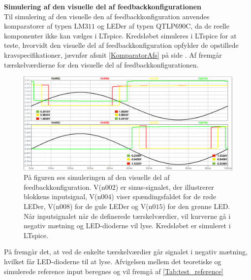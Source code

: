 \noindent\textbf{Simulering af den visuelle del af feedbackkonfigurationen} \\
Til simulering af den visuelle den af feedbackkonfiguration anvendes komparatorer af typen LM$311$ og LEDer af typen QTLP$690$C, da de reelle komponenter ikke kan vælges i LTspice. Kredsløbet simuleres i LTspice for at teste, hvorvidt den visuelle del af feedbackkonfiguration opfylder de opstillede kravspecifikationer, jævnfør afsnit \ref{KomparatorAfs} på side \pageref{KomparatorAfs}. Af  fremgår tærskelværdierne for den visuelle del af feedbackkonfigurationen. 

\begin{figure}[H]
	\centering
	\includegraphics[scale=0.3]{figures/cProblemloesning/komparator_visuel_simulering_samlet1.PNG}
	\caption{På figuren ses simuleringen af den visuelle del af feedbackkonfiguration. V(n$002$) er sinus-signalet, der illustrerer blokkens inputsignal, V(n$004$) viser spændingsfaldet for de røde LEDer, V(n$008$) for de gule LEDer og V(n$015$) for den grønne LED. Når inputsignalet når de definerede tærskelværdier, vil kurverne gå i negativ mætning og LED-dioderne vil lyse. Kredsløbet er simuleret i LTspice.}
	\label{fig:komparator_visuel_simulering_samlet1}
\end{figure}

\noindent På  fremgår det, at ved de enkelte tærskelværdier går signalet i negativ mætning, hvilket får LED-dioderne til at lyse. Afvigelsen mellem det teoretiske og simulerede reference input beregnes og vil fremgå af \ref{Tab:test_reference}


